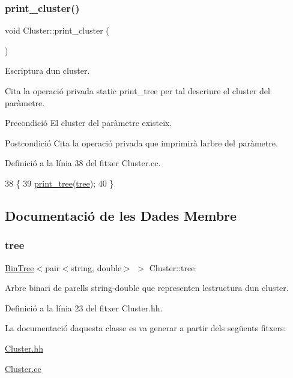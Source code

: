 \subsubsection{\texorpdfstring{print\+\_\+cluster()}{print\_cluster()}}
{\footnotesize\ttfamily void Cluster\+::print\+\_\+cluster (\begin{DoxyParamCaption}{ }\end{DoxyParamCaption})}



Escriptura d\textquotesingle{}un cluster. 

Cita la operació privada static print\+\_\+tree per tal d\textquotesingle{}escriure el cluster del paràmetre.

\begin{DoxyPrecond}{Precondició}
El cluster del paràmetre existeix. 
\end{DoxyPrecond}
\begin{DoxyPostcond}{Postcondició}
Cita la operació privada que imprimirà l\textquotesingle{}arbre del paràmetre. 
\end{DoxyPostcond}


Definició a la línia 38 del fitxer Cluster.\+cc.


\begin{DoxyCode}
38                             \{
39     \hyperlink{class_cluster_a8343114bf709fe49b69c686919d54251}{print\_tree}(\hyperlink{class_cluster_a3bfc63bfed216dd410ec687fe533c34c}{tree});
40 \}
\end{DoxyCode}


\subsection{Documentació de les Dades Membre}
\mbox{\label{class_cluster_a3bfc63bfed216dd410ec687fe533c34c}} 
\subsubsection{\texorpdfstring{tree}{tree}}
{\footnotesize\ttfamily \hyperlink{class_bin_tree}{Bin\+Tree}$<$pair$<$string, double$>$ $>$ Cluster\+::tree\hspace{0.3cm}{\ttfamily [private]}}



Arbre binari de parells string-\/double que representen l\textquotesingle{}estructura d\textquotesingle{}un cluster. 



Definició a la línia 23 del fitxer Cluster.\+hh.



La documentació d\textquotesingle{}aquesta classe es va generar a partir dels següents fitxers\+:\begin{DoxyCompactItemize}
\item 
\hyperlink{_cluster_8hh}{Cluster.\+hh}\item 
\hyperlink{_cluster_8cc}{Cluster.\+cc}\end{DoxyCompactItemize}
